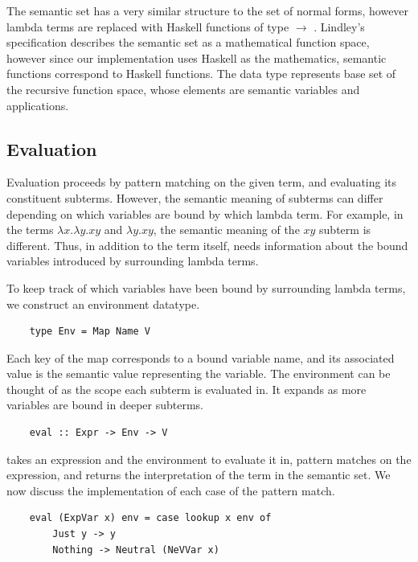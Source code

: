 The semantic set  has a very similar structure to the set of normal forms, however lambda terms are replaced with Haskell functions of type  $\rightarrow$ . Lindley's specification \cite{slides} describes the semantic set as a mathematical function space, however since our implementation uses Haskell as the mathematics, semantic functions correspond to Haskell functions. The data type represents base set of the recursive function space, whose elements are semantic variables and applications.

\subsection{Evaluation}

Evaluation proceeds by pattern matching on the given term, and evaluating its constituent subterms. However, the semantic meaning of subterms can differ depending on which variables are bound by which lambda term. For example, in the terms $\lambda x . \lambda y . xy$ and $\lambda y . xy$, the semantic meaning of the $xy$ subterm is different. Thus, in addition to the term itself,  needs information about the bound variables introduced by surrounding lambda terms. 

To keep track of which variables have been bound by surrounding lambda terms, we construct an environment datatype.

\begin{lstlisting}
    type Env = Map Name V
\end{lstlisting}

Each key of the map corresponds to a bound variable name, and its associated value is the semantic value representing the variable. The environment can be thought of as the scope each subterm is evaluated in. 
It expands as more variables are bound in deeper subterms.

\begin{lstlisting}
    eval :: Expr -> Env -> V
\end{lstlisting}

 takes an expression and the environment to evaluate it in, pattern matches on the expression, and returns the interpretation of the term in the semantic set. We now discuss the implementation of each case of the pattern match.

\begin{lstlisting}
    eval (ExpVar x) env = case lookup x env of
        Just y -> y
        Nothing -> Neutral (NeVVar x)
\end{lstlisting}

